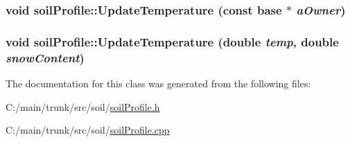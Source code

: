 \label{classsoil_profile_a746e2b78952a19280ace39d3518dc109}
\hypertarget{classsoil_profile_ab754bbc57f8cc220f59f9695d6de51e7}{
\subsubsection[{UpdateTemperature}]{\setlength{\rightskip}{0pt plus 5cm}void soilProfile::UpdateTemperature (const {\bf base} $\ast$ {\em aOwner})}}
\label{classsoil_profile_ab754bbc57f8cc220f59f9695d6de51e7}
\hypertarget{classsoil_profile_a5631b093b7853056cc794818132aa4f5}{
\subsubsection[{UpdateTemperature}]{\setlength{\rightskip}{0pt plus 5cm}void soilProfile::UpdateTemperature (double {\em temp}, \/  double {\em snowContent})}}
\label{classsoil_profile_a5631b093b7853056cc794818132aa4f5}


The documentation for this class was generated from the following files:\begin{DoxyCompactItemize}
\item 
C:/main/trunk/src/soil/\hyperlink{soil_profile_8h}{soilProfile.h}\item 
C:/main/trunk/src/soil/\hyperlink{soil_profile_8cpp}{soilProfile.cpp}\end{DoxyCompactItemize}
